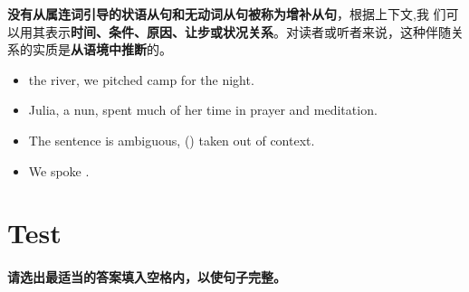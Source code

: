 \textbf{没有从属连词引导的状语从句和无动词从句被称为增补从句}，根据上下文,我
们可以用其表示\textbf{时间、条件、原因、让步或状况关系}。对读者或听者来说，这种伴随关
系的实质是\textbf{从语境中推断}的。
\begin{itemize}
\item {} the river, we pitched camp for the night.
\item Julia,  a nun, spent much of her time in
  prayer and meditation.
\item The sentence is ambiguous, () taken out of context.

\item We spoke .
\end{itemize}

\section{Test}

\paragraph{请选出最适当的答案填入空格内，以使句子完整。}

